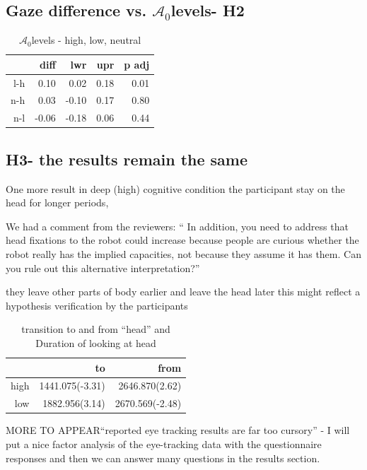 \documentclass[lettersize, noapacite, twoside, HRI]{apa_HRI}
\newcommand{\anti}{{$\mathcal{A}_0$\xspace}}
\begin{document}
\subsection{Gaze difference vs. \anti levels- H2}



\begin{table}[ht]
\caption{\anti levels - high, low, neutral}
\centering
\begin{tabular}{rrrrr}
  \hline
 & diff & lwr & upr & p adj \\ 
  \hline
l-h & 0.10 & 0.02 & 0.18 & 0.01 \\ 
  n-h & 0.03 & -0.10 & 0.17 & 0.80 \\ 
  n-l & -0.06 & -0.18 & 0.06 & 0.44 \\ 
   \hline
\end{tabular}
\end{table}


\subsection{H3- the results remain the same}

One more result in deep (high) cognitive condition the participant stay on the head for longer periods, 

We had a comment from the reviewers: 
`` In addition, you need to address that head fixations to the robot could increase because people are curious whether the robot really has the implied capacities, not because they assume it has them. Can you rule out this alternative interpretation?'' 

they leave other parts of body earlier and leave the head later this might reflect a hypothesis verification by the participants

\begin{table}[ht]
\caption{transition to and from ``head'' and Duration of looking at head}
\centering
\begin{tabular}{rrr}
  \hline
 & to & from \\ 
  \hline
high & 1441.075(-3.31) & 2646.870(2.62) \\ 
  low & 1882.956(3.14) & 2670.569(-2.48) \\ 
   \hline
\end{tabular}
\end{table}




MORE TO APPEAR``reported eye tracking results are far too cursory'' - I will put a nice factor analysis of the eye-tracking data with the questionnaire responses and then we can answer many questions in the results section. 
\end{document}
